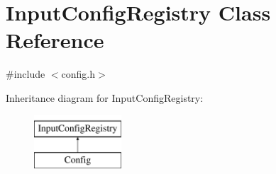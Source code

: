 \hypertarget{class_input_config_registry}{\section{Input\+Config\+Registry Class Reference}
\label{class_input_config_registry}
}


{\ttfamily \#include $<$config.\+h$>$}

Inheritance diagram for Input\+Config\+Registry\+:\begin{figure}[H]
\begin{center}
\leavevmode
\includegraphics[height=2.000000cm]{class_input_config_registry}
\end{center}
\end{figure}
